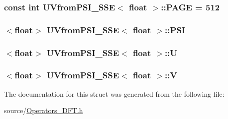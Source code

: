 \subsubsection[{P\+A\+G\+E}]{\setlength{\rightskip}{0pt plus 5cm}const int {\bf U\+Vfrom\+P\+S\+I\+\_\+\+S\+S\+E}$<$ float $>$\+::P\+A\+G\+E = 512\hspace{0.3cm}{\ttfamily [static]}}\label{struct_u_vfrom_p_s_i___s_s_e_3_01float_01_4_a0676bb743f7fca184c9b78ba95b38130}
\hypertarget{struct_u_vfrom_p_s_i___s_s_e_3_01float_01_4_abc94af3bcf4d3d119bcc0290484ead90}{}
\subsubsection[{P\+S\+I}]{$<$float$>$ {\bf U\+Vfrom\+P\+S\+I\+\_\+\+S\+S\+E}$<$ float $>$\+::P\+S\+I}\label{struct_u_vfrom_p_s_i___s_s_e_3_01float_01_4_abc94af3bcf4d3d119bcc0290484ead90}
\hypertarget{struct_u_vfrom_p_s_i___s_s_e_3_01float_01_4_aabb930a81564e88a23524891da5f45a9}{}
\subsubsection[{U}]{$<$float$>$ {\bf U\+Vfrom\+P\+S\+I\+\_\+\+S\+S\+E}$<$ float $>$\+::U}\label{struct_u_vfrom_p_s_i___s_s_e_3_01float_01_4_aabb930a81564e88a23524891da5f45a9}
\hypertarget{struct_u_vfrom_p_s_i___s_s_e_3_01float_01_4_a377c8c663c9d5a4552f9fa943fbfd826}{}
\subsubsection[{V}]{$<$float$>$ {\bf U\+Vfrom\+P\+S\+I\+\_\+\+S\+S\+E}$<$ float $>$\+::V}\label{struct_u_vfrom_p_s_i___s_s_e_3_01float_01_4_a377c8c663c9d5a4552f9fa943fbfd826}


The documentation for this struct was generated from the following file\+:\begin{DoxyCompactItemize}
\item 
source/\hyperlink{_operators___d_f_t_8h}{Operators\+\_\+\+D\+F\+T.\+h}\end{DoxyCompactItemize}
